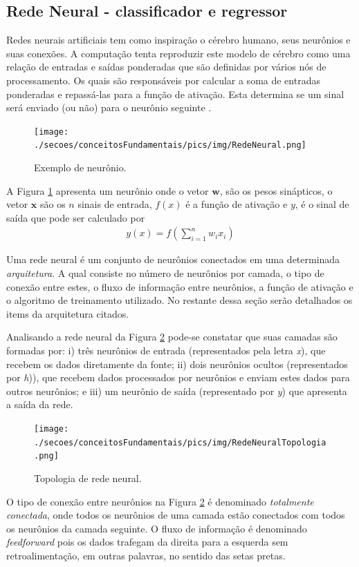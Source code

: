 \subsection{Rede Neural - classificador e regressor}
Redes neurais artificiais tem como inspiração o cérebro humano, seus neurônios e suas conexões. A computação tenta reproduzir este modelo de cérebro como uma relação de entradas e saídas ponderadas que são definidas por vários nós de processamento. Os quais são responsáveis por calcular a soma de entradas ponderadas e repassá-las para a função de ativação. Esta determina se um sinal será enviado (ou não) para o neurônio seguinte \cite{Haykin2007}.
\begin{figure}[H]
	\centering
 	\caption{Exemplo de neurônio.}
	\texttt{[image: ./secoes/conceitosFundamentais/pics/img/RedeNeural.png]}
	\label{FIGURA_REDE_NEURAL_NEURONIO}
\end{figure}
A Figura \ref{FIGURA_REDE_NEURAL_NEURONIO} apresenta um neurônio onde o vetor \(\mathbf{w}\), são os pesos sinápticos, o vetor \(\mathbf{x}\) são os \(n\) sinais de entrada, \(f(x)\) é a função de ativação e \(y\), é o sinal de saída que pode ser calculado por
\begin{align}
y(x) = f \left( \sum\limits_{i=1}^{n} w_{i}x_{i} \right)
\end{align}

Uma rede neural é um conjunto de neurônios conectados em uma determinada \emph{arquitetura}. A qual consiste no número de neurônios por camada, o tipo de conexão entre estes, o fluxo de informação entre neurônios, a função de ativação e o algoritmo de treinamento utilizado. No restante dessa seção serão detalhados os items da arquitetura citados.

Analisando a rede neural da Figura \ref{FIGURA_REDE_NEURAL_TOPOLOGIA} pode-se constatar que suas camadas são formadas por: i) três neurônios de entrada (representados pela letra \emph{x}), que recebem os dados diretamente da fonte; ii) dois neurônios ocultos (representados por \emph{h})), que recebem dados processados por neurônios e enviam estes dados para outros neurônios; e iii) um neurônio de saída (representado por \emph{y}) que apresenta a saída da rede.
\begin{figure}[H]
	\centering
 	  \caption{Topologia de rede neural.}
		\texttt{[image: ./secoes/conceitosFundamentais/pics/img/RedeNeuralTopologia.png]}
	\label{FIGURA_REDE_NEURAL_TOPOLOGIA}
\end{figure}
O tipo de conexão entre neurônios na Figura \ref{FIGURA_REDE_NEURAL_TOPOLOGIA} é denominado \emph{totalmente conectada}, onde todos os neurônios de uma camada estão conectados com todos os neurônios da camada seguinte. O fluxo de informação é denominado \emph{feedforward} pois os dados trafegam da direita para a esquerda sem retroalimentação, em outras palavras, no sentido das setas pretas.

